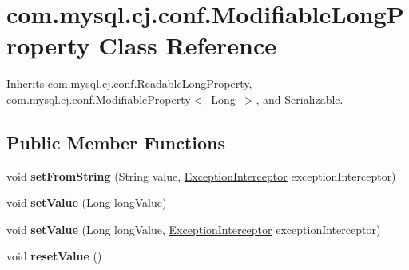 \hypertarget{classcom_1_1mysql_1_1cj_1_1conf_1_1_modifiable_long_property}{}\section{com.\+mysql.\+cj.\+conf.\+Modifiable\+Long\+Property Class Reference}
\label{classcom_1_1mysql_1_1cj_1_1conf_1_1_modifiable_long_property}


Inherits \mbox{\hyperlink{classcom_1_1mysql_1_1cj_1_1conf_1_1_readable_long_property}{com.\+mysql.\+cj.\+conf.\+Readable\+Long\+Property}}, \mbox{\hyperlink{interfacecom_1_1mysql_1_1cj_1_1conf_1_1_modifiable_property}{com.\+mysql.\+cj.\+conf.\+Modifiable\+Property$<$ Long $>$}}, and Serializable.

\subsection*{Public Member Functions}
\begin{DoxyCompactItemize}
\item 
\mbox{\label{classcom_1_1mysql_1_1cj_1_1conf_1_1_modifiable_long_property_a82139fe83023a9bb48bfb3afb065cee0}} 
void {\bfseries set\+From\+String} (String value, \mbox{\hyperlink{interfacecom_1_1mysql_1_1cj_1_1exceptions_1_1_exception_interceptor}{Exception\+Interceptor}} exception\+Interceptor)
\item 
\mbox{\label{classcom_1_1mysql_1_1cj_1_1conf_1_1_modifiable_long_property_a59e148f005d1bb1f1ec70bac45accacb}} 
void {\bfseries set\+Value} (Long long\+Value)
\item 
\mbox{\label{classcom_1_1mysql_1_1cj_1_1conf_1_1_modifiable_long_property_a6efa9fc60605885fe63c9011666e2326}} 
void {\bfseries set\+Value} (Long long\+Value, \mbox{\hyperlink{interfacecom_1_1mysql_1_1cj_1_1exceptions_1_1_exception_interceptor}{Exception\+Interceptor}} exception\+Interceptor)
\item 
\mbox{\label{classcom_1_1mysql_1_1cj_1_1conf_1_1_modifiable_long_property_a6694694d5d91d27600f90923a7e82cc5}} 
void {\bfseries reset\+Value} ()
\end{DoxyCompactItemize}
